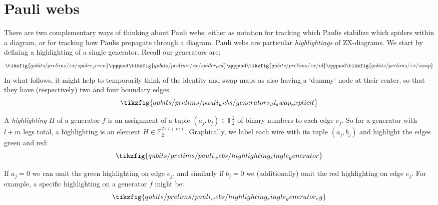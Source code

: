 \section{Pauli webs}\label{sec:pauli-webs}

There are two complementary ways of thinking about Pauli webs; either as notation for tracking which Paulis stabilize which spiders within a diagram, or for tracking how Paulis propagate through a diagram.
Pauli webs are particular \textit{highlightings} of ZX-diagrams.
We start by defining a highlighting of a single generator.
Recall our generators are:
\begin{equation}
    \begin{aligned}
        \tikzfig{qubits/prelims/zx/spider_green}
        \qqquad
        \tikzfig{qubits/prelims/zx/spider_red}
        \qqquad
        \tikzfig{qubits/prelims/zx/id}
        \qqquad
        \tikzfig{qubits/prelims/zx/swap}
    \end{aligned}
\end{equation}
In what follows, it might help to temporarily think of the identity and swap maps as also having a `dummy' node at their center, so that they have (respectively) two and four boundary edges.
\begin{equation}\label{eq:qubit_generators_id_swap_explicit}
    \tikzfig{qubits/prelims/pauli_webs/generators_id_swap_explicit}
\end{equation}

\begin{definition}\label{defn:highlighting_single_generator}
    A \textit{highlighting} $H$ of a generator $f$ is an assignment of a tuple $(a_j, b_j) \in \mathbb{F}_2^2$ of binary numbers to each edge $e_j$.
    So for a generator with $l+m$ legs total, a highlighting is an element $H \in \mathbb{F}_2^{2(l+m)}$.
    Graphically, we label each wire with its tuple $(a_j, b_j)$ and highlight the edges green and red:
    \begin{equation}
        \tikzfig{qubits/prelims/pauli_webs/highlighting_single_generator}
    \end{equation}
\end{definition}

If $a_j = 0$ we can omit the green highlighting on edge $e_j$, and similarly if $b_j = 0$ we (additionally) omit the red highlighting on edge $e_j$.
For example, a specific highlighting on a generator $f$ might be:
\begin{equation}
    \tikzfig{qubits/prelims/pauli_webs/highlighting_single_generator_eg}
\end{equation}

